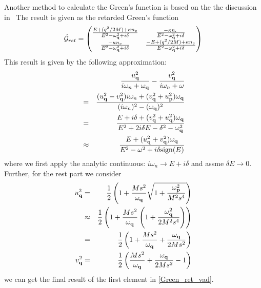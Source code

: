 Another method to calculate the Green's function is based on the the discussion in~\cite{giorgini:98di,kovalev:13lo}
The result is given as the retarded Green's function
\begin{equation}\label{Green_ret_vad}
\hat{\mathcal{G}}_{ret} =
  \begin{pmatrix}
    \frac{E+(q^2/2M) + \kappa n_c}{E^2-\omega_{\mathbf{q}}^2 + i\delta} & \frac{-\kappa n_c}{E^2-\omega_{\mathbf{q}}^2 + i\delta} \\
    \frac{-\kappa n_c}{E^2-\omega_{\mathbf{q}}^2+i\delta} & \frac{-E+(q^2/2M)+ \kappa n_c}{E^2 - \omega_{\mathbf{q}}^2+i\delta}
  \end{pmatrix}
\end{equation}
This result is given by the following approximation:
\begin{eqnarray}
    && \frac{u_{\mathbf{q}}^2}{i\omega_n + \omega_{\mathbf{q}}} - \frac{v_{\mathbf{q}}^2}{i\omega_n + \omega}\nonumber \\
    &=& \frac{(u_{\mathbf{q}}^2-v_{\mathbf{q}}^2) i\omega_n + (v_{\mathbf{q}}^2 + u_{\mathbf{p}}^2) \omega_{\mathbf{q}}}{(i\omega_n)^2 -(\omega_{\mathbf{q}})^2} \nonumber \\
    &=& \frac{E+i\delta + (v_{\mathbf{q}}^2 + u_{\mathbf{q}}^2)\omega_{\mathbf{q}}}{E^2 + 2i\delta E - \delta^2 - \omega_{\mathbf{q}}^2} \nonumber \\
    &\approx& \frac{E + (u_{\mathbf{q}}^2 + v_{\mathbf{q}}^2)\omega_{\mathbf{q}} }{E^2 -\omega^2 +i\delta \mathrm{sign}(E)}
\end{eqnarray}
where we first apply the analytic continuous: $i\omega_n \to E + i \delta$ and assme $\delta E \to 0$.
Further, for the rest part we consider
\begin{eqnarray}
    u_{\mathbf{q}}^2 &=& \frac{1}{2} \left( 1 + \frac{Ms^2}{\omega_{\mathbf{q}}} \sqrt{1 + \frac{\omega_{\mathbf{p}}^2}{M^2 s^4} } \right) \nonumber \\
    &\approx& \frac{1}{2} \left( 1 + \frac{Ms^2}{\omega_{\mathbf{q}}} \left( 1 + \frac{\omega_{\mathbf{q}}^2}{2 M^2 s^4} \right) \right) \nonumber \\
    &=& \frac{1}{2} \left( 1 + \frac{Ms^2}{\omega_{\mathbf{q}}} + \frac{\omega_{\mathbf{q}}}{2 M s^2}  \right) \\
    v_{\mathbf{q}}^2 &=& \frac{1}{2} \left( \frac{Ms^2}{\omega_{\mathbf{q}}} + \frac{\omega_{\mathbf{q}}}{2 M s^2}  -1 \right)
\end{eqnarray}
we can get the final result of the first element in \eqref{Green_ret_vad}.
